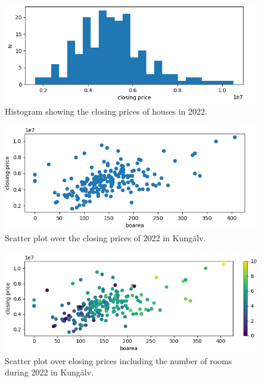 \documentclass[a4paper]{article}
\begin{document}
\begin{figure}[H]
  \begin{center}
    \includegraphics[scale=0.5]{hist.png}
    \caption{Histogram showing the closing prices of houses in 2022.}
    \label{hist}
  \end{center}
\end{figure}

\begin{figure}[H]
  \begin{center}
    \includegraphics[scale=0.5]{scatter.png}
    \caption{Scatter plot over the closing prices of 2022 in Kungälv.}
    \label{scatter}
  \end{center}
\end{figure}

\begin{figure}[H]
  \begin{center}
    \includegraphics[scale=0.5]{scatter2.png}
    \caption{Scatter plot over closing prices including the number of rooms during 2022 in Kungälv.}
    \label{scatter2}
  \end{center}
\end{figure}
\end{document}
